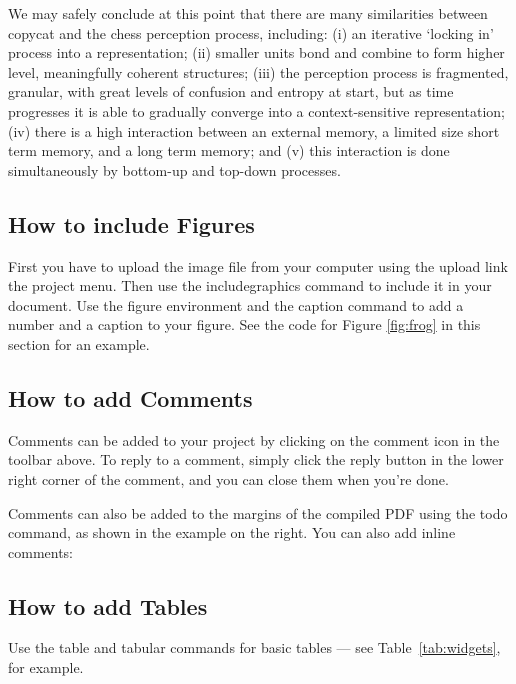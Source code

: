 We may safely conclude at this point that there are many similarities between copycat and the chess perception process, including: (i) an iterative ‘locking in’ process into a representation; (ii) smaller units bond and combine to form higher level, meaningfully coherent structures; (iii) the perception process is fragmented, granular, with great levels of confusion and entropy at start, but as time progresses it is able to gradually converge into a context-sensitive representation; (iv) there is a high interaction between an external memory, a limited size short term memory, and a long term memory; and (v) this interaction is done simultaneously by bottom-up and top-down processes.  

\subsection{How to include Figures}


First you have to upload the image file from your computer using the upload link the project menu. Then use the includegraphics command to include it in your document. Use the figure environment and the caption command to add a number and a caption to your figure. See the code for Figure \ref{fig:frog} in this section for an example.




\subsection{How to add Comments}

Comments can be added to your project by clicking on the comment icon in the toolbar above. %
%
%
To reply to a comment, simply click the reply button in the lower right corner of the comment, and you can close them when you're done.

Comments can also be added to the margins of the compiled PDF using the todo command, as shown in the example on the right. You can also add inline comments:


\subsection{How to add Tables}

Use the table and tabular commands for basic tables --- see Table~\ref{tab:widgets}, for example. 

